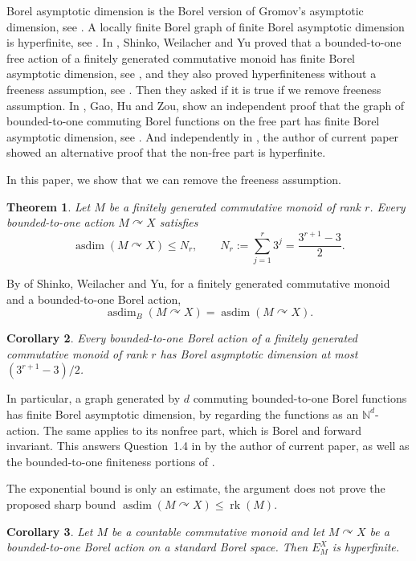 \documentclass[10pt,a4paper]{amsart}
\newtheorem{theorem}{Theorem}[section]
\newtheorem{corollary}[theorem]{Corollary}
\DeclareMathOperator{\asdim}{asdim}
\DeclareMathOperator{\rk}{rk}
\newcommand{\NN}{\mathbb N}
\newcommand{\act}{\curvearrowright}
\begin{document}
Borel asymptotic dimension is the Borel version of Gromov's asymptotic dimension, see \cite{Gro93}. A locally finite Borel graph of finite Borel asymptotic dimension is hyperfinite, see \cite{CJMST}. In \cite{SWY}, Shinko, Weilacher and Yu proved that a bounded-to-one free action of a finitely generated commutative monoid has finite Borel asymptotic dimension, see \cite[Theorem 1.6]{SWY}, and they also proved hyperfiniteness without a freeness assumption, see \cite[Theorem 1.5]{SWY}. Then they asked if it is true if we remove freeness assumption. In \cite{GHZ}, Gao, Hu and Zou, show an independent proof that the graph of bounded-to-one commuting Borel functions on the free part has finite Borel asymptotic dimension, see \cite[Theorem 1.2]{GHZ}. And independently in \cite{Wang}, the author of current paper showed an alternative proof that the non-free part is hyperfinite.

In this paper, we show that we can remove the freeness assumption.


\begin{theorem}\label{thm:main}
Let $M$ be a finitely generated commutative monoid of rank $r$. Every
bounded-to-one action $M\act X$ satisfies
\begin{equation}\label{eq:main-bound}
  \asdim(M\act X)\le N_r,
  \qquad
  N_r:=\sum_{j=1}^{r}3^j=\frac{3^{r+1}-3}{2}.
\end{equation}
\end{theorem}


By \cite[Corollary~5.16]{SWY} of Shinko, Weilacher and Yu, for a finitely generated commutative monoid and a bounded-to-one Borel
action,
\[
 \asdim_B(M\act X)=\asdim(M\act X).
\]

\begin{corollary}\label{cor:borel}
Every bounded-to-one Borel action of a finitely generated commutative
monoid of rank $r$ has Borel asymptotic dimension at most
$(3^{r+1}-3)/2$.
\end{corollary}

In particular, a graph generated by $d$ commuting bounded-to-one Borel
functions has finite Borel asymptotic dimension, by regarding the functions
as an $\NN^d$-action. The same applies to its nonfree part, which is Borel
and forward invariant. This answers Question~1.4 in \cite{Wang} by the author of current paper, as
well as the bounded-to-one finiteness portions of
\cite[Questions~1.8 and~5.17]{SWY}.

The exponential bound is only an estimate, the argument does not prove the proposed
sharp bound $\asdim(M\act X)\le\rk(M)$.
\begin{corollary}\label{cor:countable-hyperfinite}
Let $M$ be a countable commutative monoid and let $M\act X$ be a
bounded-to-one Borel action on a standard Borel space. Then
$E_M^X$ is hyperfinite.
\end{corollary}
\end{document}
